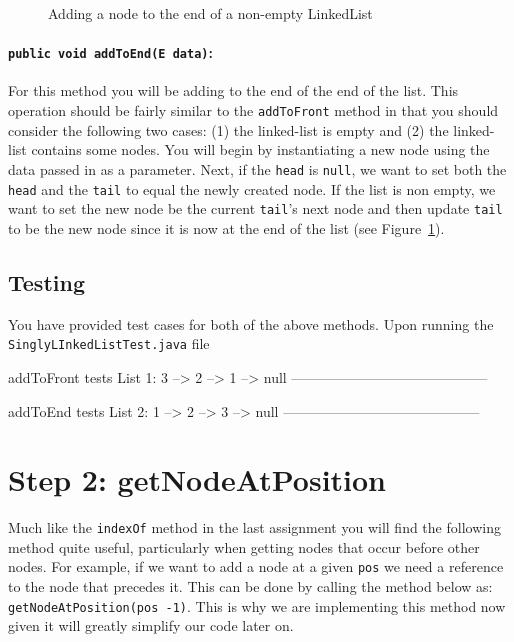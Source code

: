 \begin{figure}[H]

\caption{Adding a node to the end of a non-empty LinkedList}
\label{fig:addtoback}
\end{figure}


\paragraph{\lstinline|public void addToEnd(E data)|: } For this method you will
be adding to the end of the end of the list. This operation should be fairly
similar to the \lstinline|addToFront| method in that you should consider the
following two cases: (1) the linked-list is empty and (2) the linked-list
contains some nodes. You will begin by instantiating a new node using the 
data passed in as a parameter. Next, if the \lstinline|head| is \lstinline|null|,
we want to set both the \lstinline|head| and the \lstinline|tail| to equal 
the newly created node. If the list is non empty, we want to set the new node
be the current \lstinline|tail|'s next node and then update \lstinline|tail| to 
be the new node since it is now at the end of the list (see Figure~\ref{fig:addtoback}).

\subsection*{Testing}
You have provided test cases for both of the above methods. Upon running the
\texttt{SinglyLInkedListTest.java} file
\begin{shell}
addToFront tests
List 1: 3 --> 2 --> 1 --> null
------------------------------------------

addToEnd tests
List 2: 1 --> 2 --> 3 --> null
------------------------------------------
\end{shell}

\newpage

\section{Step 2: getNodeAtPosition}

Much like the \lstinline|indexOf| method in the last assignment you will find
the following method quite useful, particularly when getting nodes that occur
before other nodes. For example, if we want to add a node at a given
\lstinline|pos| we need a reference to the node that precedes it. This can be
done by calling the method below as: \lstinline|getNodeAtPosition(pos -1)|.
This is why we are implementing this method now given it will greatly simplify
our code later on.

